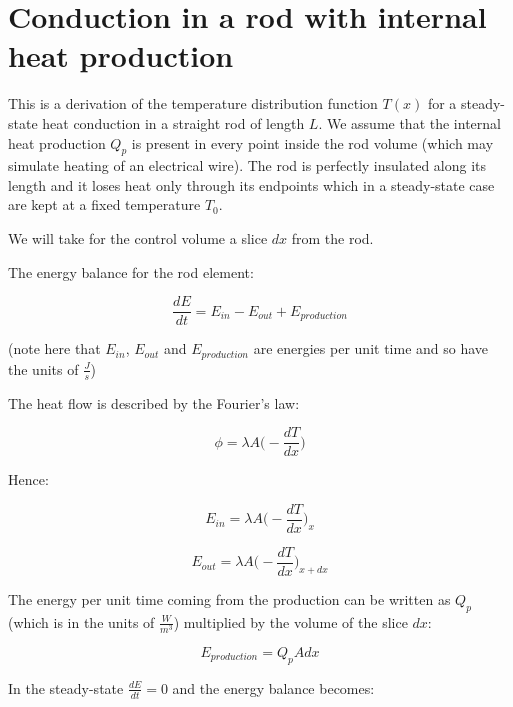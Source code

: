 \documentclass[10pt]{article}
\begin{document}
\setlength{\parskip}{0.6em}
\setlength{\parindent}{0cm}

\section*{Conduction in a rod with internal heat production}

This is a derivation of the temperature distribution function $T(x)$ for a steady-state heat conduction in a straight rod of length $L$. We assume that the internal heat production $Q_p$ is present in every point inside the rod volume (which may simulate heating of an electrical wire). The rod is perfectly insulated along its length and it loses heat only through its endpoints which in a steady-state case are kept at a fixed temperature $T_0$.

We will take for the control volume a slice $dx$ from the rod. 

The energy balance for the rod element:

\begin{equation}
\frac{dE}{dt} = E_{in} - E_{out} + E_{production}
\end{equation}

(note here that $E_{in}$, $E_{out}$ and $E_{production}$ are energies per unit time and so have the units of $\frac{J}{s}$)

The heat flow is described by the Fourier's law:

\begin{equation}
\phi = \lambda A \Big(- \frac{dT}{dx} \Big)
\label{eq:fourier}
\end{equation}

Hence:

\begin{equation}
E_{in} = \lambda A \Big(- \frac{dT}{dx} \Big)_x
\end{equation}

\begin{equation}
E_{out} = \lambda A \Big(- \frac{dT}{dx} \Big)_{x + dx}
\end{equation}


The energy per unit time coming from the production can be written as $Q_p$ (which is in the units of $\frac{W}{m^3}$) multiplied by the volume of the slice $dx$:

\begin{equation}
E_{production} = Q_p A dx
\end{equation}

In the steady-state $\frac{dE}{dt} = 0$ and the energy balance becomes:
\end{document}
